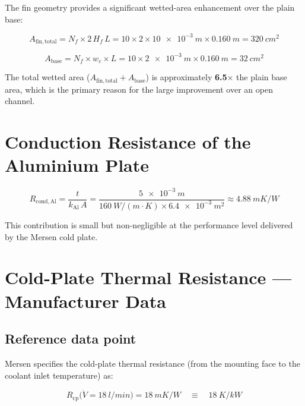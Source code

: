 \documentclass[a4paper,11pt]{article}
\begin{document}
The fin geometry provides a significant wetted-area enhancement over the plain base:

\begin{equation}
  A_{\mathrm{fin,total}} = N_f \times 2\,H_f\,L
    = 10 \times 2 \times \SI{10e-3}{m} \times \SI{0.160}{m} = \SI{320}{cm^2}
\end{equation}

\begin{equation}
  A_{\mathrm{base}} = N_f \times w_c \times L
    = 10 \times \SI{2e-3}{m} \times \SI{0.160}{m} = \SI{32}{cm^2}
\end{equation}

The total wetted area ($A_{\mathrm{fin,total}} + A_{\mathrm{base}}$) is approximately
\textbf{6.5$\times$} the plain base area, which is the primary reason for the large
improvement over an open channel.

\section{Conduction Resistance of the Aluminium Plate}

\begin{equation}
  R_{\mathrm{cond,Al}} = \frac{t}{k_{\mathrm{Al}}\,A}
    = \frac{\SI{5e-3}{m}}{\SI{160}{W/(m\cdot K)} \times \SI{6.4e-3}{m^2}}
    \approx \SI{4.88}{mK/W}
\end{equation}

This contribution is small but non-negligible at the performance level delivered by
the Mersen cold plate.

\section{Cold-Plate Thermal Resistance --- Manufacturer Data}

\subsection{Reference data point}

Mersen specifies the cold-plate thermal resistance (from the mounting face to the
coolant inlet temperature) as:

\begin{equation}
  R_{\mathrm{cp}} \bigl(\dot{V} = \SI{18}{l/min}\bigr) = \SI{18}{mK/W}
  \quad\equiv\quad \SI{18}{K/kW}
\end{equation}
\end{document}
